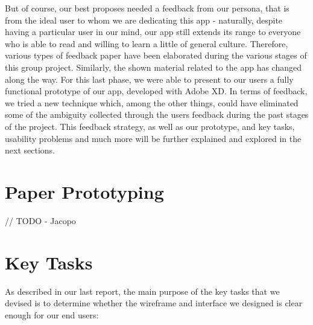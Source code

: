 \documentclass[12pt]{scrartcl}
\begin{document}
	But of course, our best proposes needed a feedback from our persona, that is from the ideal user to whom we are dedicating this app - naturally, despite having a particular user in our mind, our app still extends its range to everyone who is able to read and willing to learn a little of general culture. Therefore, various types of feedback paper have been elaborated during the various stages of this group project. Similarly, the shown material related to the app has changed along the way. For this last phase, we were able to present to our users a fully functional prototype of our app, developed with Adobe XD. In terms of feedback, we tried a new technique which, among the other things, could have eliminated some of the ambiguity collected through the users feedback during the past stages of the project. This feedback strategy, as well as our prototype, and key tasks, usability problems and much more will be further explained and explored in the next sections. 

	\newpage	
	
\section{Paper Prototyping}

	
	// TODO - Jacopo
	
	
\section{Key Tasks}

	
	As described in our last report, the main purpose of the key tasks that we devised is to determine 
	whether the wireframe and interface we designed is clear enough for our end users:
	
\end{document}
